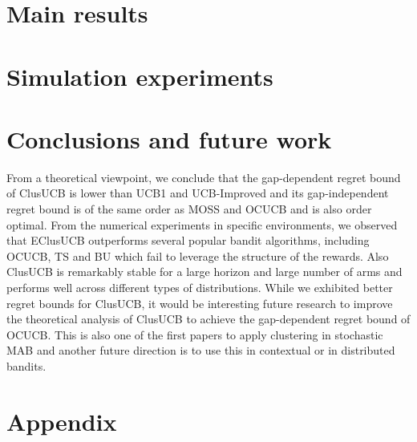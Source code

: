 \documentclass{article}
\begin{document}
\section{Main results}
\label{sec:results}



\section{Simulation experiments}
\label{sec:expts}



\section{Conclusions and future work}
\label{sec:conclusions}
From a theoretical viewpoint, we conclude that the gap-dependent regret bound of ClusUCB is lower than UCB1 and UCB-Improved and its gap-independent regret bound is of the same order as MOSS and OCUCB and is also order optimal. From the numerical experiments in specific environments, we observed that EClusUCB outperforms several popular bandit algorithms,  including OCUCB, TS and BU which fail to leverage the structure of the rewards. Also ClusUCB is remarkably stable for a large horizon and large number of arms and performs well across different types of distributions. While we exhibited better regret bounds for ClusUCB, it would be interesting future research to improve the theoretical analysis of ClusUCB to achieve the gap-dependent regret bound of OCUCB. This is also one of the first papers to apply clustering in stochastic MAB and another future direction is to use this in contextual or in distributed bandits. 






%



\clearpage
\newpage
\section*{Appendix}

\end{document}
